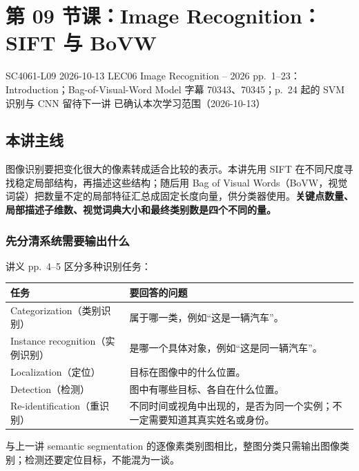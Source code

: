 
\section{第 09 节课：Image Recognition：SIFT 与 BoVW}
\label{lecture:SC4061-L09}

\lecturemeta
  {SC4061-L09}
  {2026-10-13}
  {LEC06 Image Recognition -- 2026}
  {pp.~1--23：Introduction；Bag-of-Visual-Word Model}
  {字幕 70343、70345；p.~24 起的 SVM 识别与 CNN 留待下一讲}
  {已确认本次学习范围（2026-10-13）}

\subsection{本讲主线}

图像识别要把变化很大的像素转成适合比较的表示。本讲先用 SIFT 在不同尺度寻找稳定局部结构，再描述这些结构；随后用 Bag of Visual Words（BoVW，视觉词袋）把数量不定的局部特征汇总成固定长度向量，供分类器使用。\textbf{关键点数量、局部描述子维数、视觉词典大小和最终类别数是四个不同的量。}


\subsubsection*{先分清系统需要输出什么}

讲义 pp.~4--5 区分多种识别任务：
\begin{center}
\begin{tabularx}{\textwidth}{@{}>{\raggedright\arraybackslash}p{4.1cm}X@{}}
  \toprule
  任务 & 要回答的问题 \\
  \midrule
  Categorization（类别识别） & 属于哪一类，例如“这是一辆汽车”。\\
  Instance recognition（实例识别） & 是哪一个具体对象，例如“这是同一辆汽车”。\\
  Localization（定位） & 目标在图像中的什么位置。\\
  Detection（检测） & 图中有哪些目标、各自在什么位置。\\
  Re-identification（重识别） & 不同时间或视角中出现的，是否为同一个实例；不一定需要知道其真实姓名或身份。\\
  \bottomrule
\end{tabularx}
\end{center}
与上一讲 semantic segmentation 的逐像素类别图相比，整图分类只需输出图像类别；检测还要定位目标，不能混为一谈。

